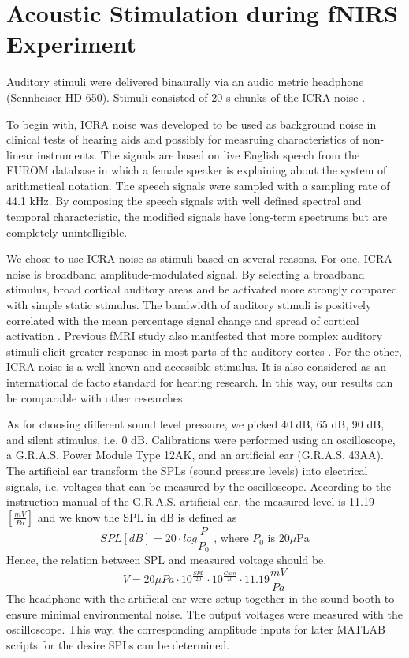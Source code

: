 \section {Acoustic Stimulation during fNIRS Experiment}
Auditory stimuli were delivered binaurally via an audio metric headphone (Sennheiser HD 650). Stimuli consisted of 20-s chunks of the ICRA noise \cite {Dreschler}. 

To begin with, ICRA noise was developed to be used as background noise in clinical tests of hearing aids and possibly for measruing characteristics of non-linear instruments. The signals are based on live English speech from the EUROM database \cite {chanEUROM} in which a female speaker is explaining about the system of arithmetical notation. The speech signals were sampled with a sampling rate of 44.1 kHz. By composing the speech signals with well defined spectral and temporal characteristic, the modified signals have long-term spectrums but are completely unintelligible. 
 
We chose to use ICRA noise as stimuli based on several reasons. For one, ICRA noise is broadband amplitude-modulated signal. By selecting a broadband stimulus, broad cortical auditory areas and be activated more strongly compared with simple static stimulus. The bandwidth of auditory stimuli is positively correlated with the mean percentage signal change and spread of cortical activation \cite {Hall}. Previous fMRI study also manifested that more complex auditory stimuli elicit greater response in most parts of the auditory cortes \cite {Belin}. For the other, ICRA noise is a well-known and accessible stimulus. It is also considered as an international de facto standard for hearing research. In this way, our results can be comparable with other researches.
 
As for choosing different sound level pressure, we picked 40 dB, 65 dB, 90 dB, and silent stimulus, i.e. 0 dB. Calibrations were performed using an oscilloscope, a G.R.A.S. Power Module Type 12AK,  and an artificial ear (G.R.A.S. 43AA). The artificial ear transform the SPLs (sound pressure levels) into electrical signals, i.e. voltages that can be measured by the oscilloscope. According to the instruction manual of the G.R.A.S. artificial ear, the measured level is 11.19 $[ \frac {mV}{Pa}]$ and we know the SPL in dB is defined as 
\[
SPL [dB] = 20 \cdot log \frac{P}{P_0} \text{ , where $P_0$ is $20 \mu$Pa}
\] 
Hence, the relation between SPL and measured voltage should be.
\[
V = 20{ \mu Pa} \cdot 10^{\frac {SPL}{20}}  \cdot 10^{\frac{Gain}{20}} \cdot 11.19 {\frac {mV}{Pa}} 
\]
The headphone with the artificial ear were setup together in the sound booth to ensure minimal environmental noise. The output voltages were measured with the oscilloscope. This way, the corresponding amplitude inputs for later MATLAB scripts for the desire SPLs can be determined.

